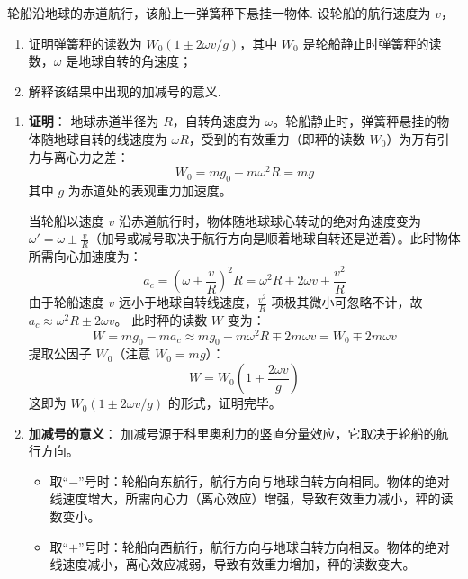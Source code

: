 \begin{exercise}\label{ex:4.2}
轮船沿地球的赤道航行，该船上一弹簧秤下悬挂一物体. 设轮船的航行速度为 $v$，
\begin{enumerate}
  \item[(a)] 证明弹簧秤的读数为 $W_0 (1 \pm 2\omega v/g)$，其中 $W_0$ 是轮船静止时弹簧秤的读数，$\omega$ 是地球自转的角速度；
  \item[(b)] 解释该结果中出现的加减号的意义.
\end{enumerate}
\end{exercise}
\begin{solution}
\begin{enumerate}
    \item[(a)] \textbf{证明}：
    地球赤道半径为 $R$，自转角速度为 $\omega$。轮船静止时，弹簧秤悬挂的物体随地球自转的线速度为 $\omega R$，受到的有效重力（即秤的读数 $W_0$）为万有引力与离心力之差：
    $$ W_0 = mg_0 - m\omega^2 R = m g $$
    其中 $g$ 为赤道处的表观重力加速度。

    当轮船以速度 $v$ 沿赤道航行时，物体随地球球心转动的绝对角速度变为 $\omega' = \omega \pm \frac{v}{R}$（加号或减号取决于航行方向是顺着地球自转还是逆着）。此时物体所需向心加速度为：
    $$ a_c = \left( \omega \pm \frac{v}{R} \right)^2 R = \omega^2 R \pm 2\omega v + \frac{v^2}{R} $$
    由于轮船速度 $v$ 远小于地球自转线速度，$\frac{v^2}{R}$ 项极其微小可忽略不计，故 $a_c \approx \omega^2 R \pm 2\omega v$。
    此时秤的读数 $W$ 变为：
    $$ W = mg_0 - m a_c \approx mg_0 - m\omega^2 R \mp 2m\omega v = W_0 \mp 2m\omega v $$
    提取公因子 $W_0$（注意 $W_0 = mg$）：
    $$ W = W_0 \left( 1 \mp \frac{2\omega v}{g} \right) $$
    这即为 $W_0 (1 \pm 2\omega v/g)$ 的形式，证明完毕。

    \item[(b)] \textbf{加减号的意义}：
    加减号源于科里奥利力的竖直分量效应，它取决于轮船的航行方向。
    \begin{itemize}
        \item 取“$-$”号时：轮船向东航行，航行方向与地球自转方向相同。物体的绝对线速度增大，所需向心力（离心效应）增强，导致有效重力减小，秤的读数变小。
        \item 取“$+$”号时：轮船向西航行，航行方向与地球自转方向相反。物体的绝对线速度减小，离心效应减弱，导致有效重力增加，秤的读数变大。
    \end{itemize}
\end{enumerate}
\end{solution}

